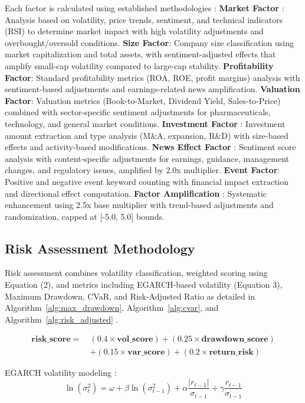 \documentclass[3p,times,procedia]{elsarticle}
\begin{document}
Each factor is calculated using established methodologies \cite{Carhart1997}: \textbf{Market Factor} \cite{FAMA1993}: Analysis based on volatility, price trends, sentiment, and technical indicators (RSI) to determine market impact with high volatility adjustments and overbought/oversold conditions. \textbf{Size Factor}: Company size classification using market capitalization and total assets, with sentiment-adjusted effects that amplify small-cap volatility compared to large-cap stability. \textbf{Profitability Factor}: Standard profitability metrics (ROA, ROE, profit margins) analysis with sentiment-based adjustments and earnings-related news amplification. \textbf{Valuation Factor}: Valuation metrics (Book-to-Market, Dividend Yield, Sales-to-Price) combined with sector-specific sentiment adjustments for pharmaceuticals, technology, and general market conditions. \textbf{Investment Factor} \cite{Daniel1998}: Investment amount extraction and type analysis (M\&A, expansion, R\&D) with size-based effects and activity-based modifications. \textbf{News Effect Factor} \cite{TETLOCK2007}: Sentiment score analysis with content-specific adjustments for earnings, guidance, management changes, and regulatory issues, amplified by 2.0x multiplier. \textbf{Event Factor}: Positive and negative event keyword counting with financial impact extraction and directional effect computation. \textbf{Factor Amplification} \cite{Harvey2016}: Systematic enhancement using 2.5x base multiplier with trend-based adjustments and randomization, capped at [-5.0, 5.0] bounds.

\subsection{Risk Assessment Methodology}
Risk assessment combines volatility classification, weighted scoring using Equation (2), and metrics including EGARCH-based volatility (Equation 3), Maximum Drawdown, CVaR, and Risk-Adjusted Ratio as detailed in Algorithm~\ref{alg:max_drawdown}, Algorithm~\ref{alg:cvar}, and Algorithm~\ref{alg:risk_adjusted} \cite{Jorion2001}.

\begin{align}
\mathbf{risk\_score} =\ & (0.4 \times \mathbf{vol\_score}) + (0.25 \times \mathbf{drawdown\_score}) \nonumber \\
& + (0.15 \times \mathbf{var\_score}) + (0.2 \times \mathbf{return\_risk})
\end{align}

EGARCH volatility modeling \cite{Nelson1991}:
\begin{equation}
\ln(\sigma_t^2) = \omega + \beta \ln(\sigma_{t-1}^2) + \alpha \frac{|r_{t-1}|}{\sigma_{t-1}} + \gamma \frac{r_{t-1}}{\sigma_{t-1}}
\end{equation}
\end{document}
